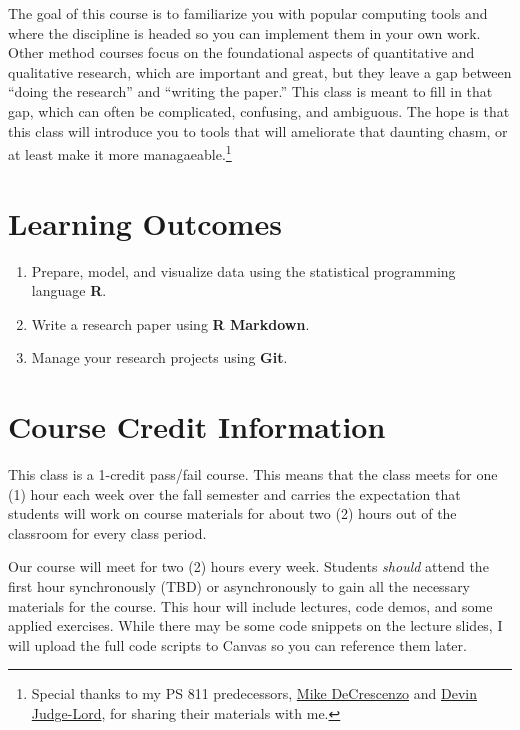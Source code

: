 \documentclass[11pt,]{article}
\begin{document}
The goal of this course is to familiarize you with popular computing
tools and where the discipline is headed so you can implement them in
your own work. Other method courses focus on the foundational aspects of
quantitative and qualitative research, which are important and great,
but they leave a gap between ``doing the research'' and ``writing the
paper.'' This class is meant to fill in that gap, which can often be
complicated, confusing, and ambiguous. The hope is that this class will
introduce you to tools that will ameliorate that daunting chasm, or at
least make it more managaeable.\footnote{Special thanks to my PS 811
  predecessors, \href{https://mikedecr.github.io/}{Mike DeCrescenzo} and
  \href{https://judgelord.github.io}{Devin Judge-Lord}, for sharing
  their materials with me.}

\hypertarget{learning-outcomes}{%
\section{Learning Outcomes}\label{learning-outcomes}}

\begin{enumerate}
\def\labelenumi{\arabic{enumi}.}
\item
  Prepare, model, and visualize data using the statistical programming
  language \textbf{R}.
\item
  Write a research paper using \textbf{R Markdown}.
\item
  Manage your research projects using \textbf{Git}.
\end{enumerate}

\hypertarget{course-credit-information}{%
\section{Course Credit Information}\label{course-credit-information}}

This class is a 1-credit pass/fail course. This means that the class
meets for one (1) hour each week over the fall semester and carries the
expectation that students will work on course materials for about two
(2) hours out of the classroom for every class period.

Our course will meet for two (2) hours every week. Students
\emph{should} attend the first hour synchronously (TBD) or
asynchronously to gain all the necessary materials for the course. This
hour will include lectures, code demos, and some applied exercises.
While there may be some code snippets on the lecture slides, I will
upload the full code scripts to Canvas so you can reference them later.
\end{document}
